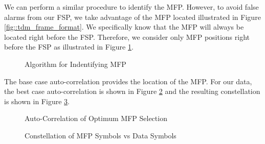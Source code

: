 \documentclass[conference,onecolumn]{IEEEtran}
\begin{document}
We can perform a similar procedure to identify the MFP. However, to avoid false alarms from our FSP, we take advantage of the MFP located illustrated in Figure \ref{fig::tdm_frame_format}. We specifically know that the MFP will always be located right before the FSP. Therefore, we consider only MFP positions right before the FSP as illustrated in Figure \ref{fig::finding_mfp}.

\begin{figure}[H]
	\centerline{}
	\caption{Algorithm for Indentifying MFP}
	\label{fig::finding_mfp}
\end{figure}

The base case auto-correlation provides the location of the MFP. For our data, the best case auto-correlation is shown in Figure \ref{fig::mfp_correlation} and the resulting constellation is shown in Figure \ref{fig::mfp_constellation}.

\begin{figure}[H]
	\centerline{}
	\caption{Auto-Correlation of Optimum MFP Selection}
	\label{fig::mfp_correlation}
\end{figure}

\begin{figure}[H]
	\centerline{}
	\caption{Constellation of MFP Symbols vs Data Symbols}
	\label{fig::mfp_constellation}
\end{figure}
\end{document}
